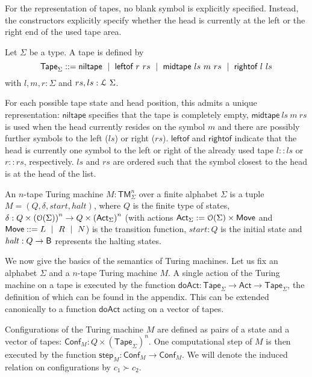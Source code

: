 \documentclass[a4paper,UKenglish,cleveref, autoref]{lipics-v2019}
\begin{document}
For the representation of tapes, no blank symbol is explicitly specified. Instead, the constructors explicitly specify whether the head is currently at the left or the right end of the used tape area.
\begin{definition}[Tapes] \label{def:tapes}
  Let $\Sigma$ be a type. A tape is defined by
  \[\textsf{Tape}_\Sigma ::= \textsf{niltape} ~\mid~ \textsf{leftof}~r~rs ~\mid~ \textsf{midtape}~ls~m~rs ~\mid~ \textsf{rightof}~l~ls \]
  with $l, m, r : \Sigma$ and $rs, ls : \mathcal{L}~{\Sigma}$. 
\end{definition}

For each possible tape state and head position, this admits a unique representation: $\textsf{niltape}$ specifies that the tape is completely empty, $\textsf{midtape}~ls~m~rs$ is used when the head currently resides on the symbol $m$ and there are possibly further symbols to the left ($ls$) or right ($rs$). $\textsf{leftof}$ and $\textsf{rightof}$ indicate that the head is currently one symbol to the left or right of the already used tape $l::ls$ or $r::rs$, respectively. 
$ls$ and $rs$ are ordered such that the symbol closest to the head is at the head of the list. 

\begin{definition}
  An $n$-tape Turing machine $M : \textsf{TM}_\Sigma^n$ over a finite alphabet $\Sigma$ is a tuple $M = (Q, \delta, \mathit{start}, \mathit{halt})$, where $Q$ is the finite type of states, $\delta : Q \times {(\mathcal{O}{(\Sigma)})}^n \rightarrow Q \times {(\textsf{Act}_\Sigma)}^n$ (with actions $\textsf{Act}_\Sigma := \mathcal{O}{(\Sigma)} \times \textsf{Move}$ and $\textsf{Move} ::= L ~\mid~ R ~\mid~ N$) is the transition function, $\mathit{start} : Q$ is the initial state and $\mathit{halt} : Q \rightarrow \textsf{B}$ represents the halting states. 
\end{definition}

We now give the basics of the semantics of Turing machines. Let us fix an alphabet $\Sigma$ and a $n$-tape Turing machine $M$.
A single action of the Turing machine on a tape is executed by the function $\textsf{doAct} : \textsf{Tape}_\Sigma \rightarrow \textsf{Act} \rightarrow \textsf{Tape}_\Sigma$, the definition of which can be found in the appendix. This can be extended canonically to a function $\textsf{doAct}$ acting on a vector of tapes.

Configurations of the Turing machine $M$ are defined as pairs of a state and a vector of tapes: $\textsf{Conf}_M : Q \times {(\textsf{Tape}_\Sigma)}^n$. One computational step of $M$ is then executed by the function $\textsf{step}_M : \textsf{Conf}_M \rightarrow \textsf{Conf}_M$. We will denote the induced relation on configurations by $c_1 \succ c_2$.
\end{document}
